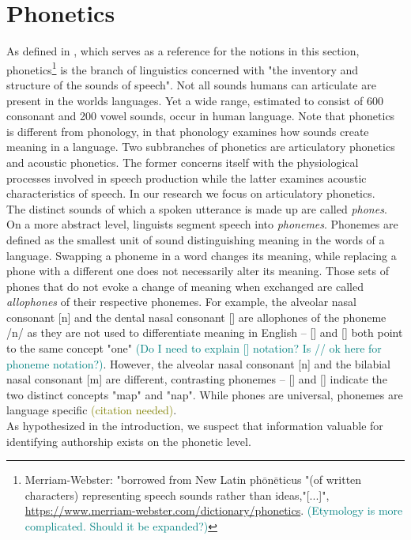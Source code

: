 \section{Phonetics}\label{sec:phonetics}
As defined in \cite{ogrady2017introToLinguistics}, which serves as a reference for the notions in this section, phonetics\footnote{Merriam-Webster: "borrowed from New Latin ph$\bar{\mbox{o}}$n$\bar{\mbox{e}}$ticus "(of written characters) representing speech sounds rather than ideas,"[...]", \url{https://www.merriam-webster.com/dictionary/phonetics}. \textcolor{teal}{(Etymology is more complicated. Should it be expanded?)}} is the branch of linguistics concerned with "the inventory and structure of the sounds of speech".
Not all sounds humans can articulate are present in the worlds languages.
Yet a wide range, estimated to consist of 600 consonant and 200 vowel sounds, occur in human language.
Note that phonetics is different from phonology, in that phonology examines how sounds create meaning in a language.
Two subbranches of phonetics are articulatory phonetics and acoustic phonetics.
The former concerns itself with the physiological processes involved in speech production while the latter examines acoustic characteristics of speech.
In our research we focus on articulatory phonetics.\\
The distinct sounds of which a spoken utterance is made up are called \textit{phones}.
On a more abstract level, linguists segment speech into \textit{phonemes}.
Phonemes are defined as the smallest unit of sound distinguishing meaning in the words of a language.
Swapping a phoneme in a word changes its meaning, while replacing a phone with a different one does not necessarily alter its meaning.
Those sets of phones that do not evoke a change of meaning when exchanged are called \textit{allophones} of their respective phonemes.
For example, the alveolar nasal consonant [n] and the dental nasal consonant [\textipa{\|[n}] are allophones of the phoneme /n/ as they are not used to differentiate meaning in English -- [] and [\textipa{w2\|[n}] both point to the same concept "one" \textcolor{teal}{(Do I need to explain [] notation? Is // ok here for phoneme notation?)}.
However, the alveolar nasal consonant [n] and the bilabial nasal consonant [m] are different, contrasting phonemes -- [] and [] indicate the two distinct concepts "map" and "nap".
While phones are universal, phonemes are language specific \textcolor{olive}{(citation needed)}.\\
As hypothesized in the introduction, we suspect that information valuable for identifying authorship exists on the phonetic level.
